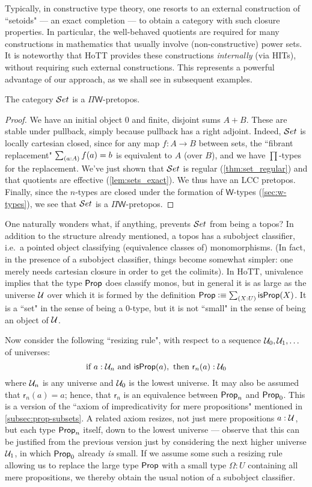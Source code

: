 Typically, in constructive type theory, one resorts to an external construction of ``setoids" --- an exact completion --- to obtain a category with such closure properties.  In particular, the well-behaved quotients are required for many constructions in mathematics that usually involve (non-constructive) power sets.  It is noteworthy that HoTT  provides these constructions \emph{internally} (via HITs), without requiring such external constructions.  This represents a powerful advantage of our approach, as we shall see in subsequent examples.

\begin{thm} The category $\mathcal{S}et$ is a $\Pi\mathsf{W}$-pretopos.
\end{thm}
\begin{proof}
We have an initial object $0$ and finite, disjoint sums $A+B$.  These are stable under pullback, simply because pullback has a right adjoint.  Indeed, $\mathcal{S}et$ is locally cartesian closed, since for any map $f:A\to B$ between sets, the ``fibrant replacement" $\sm{a:A}f(a)=b$ is equivalent to $A$ (over $B$), and we have $\prod$-types for the replacement.
We've just shown that $\mathcal{S}et$ is regular (\autoref{thm:set_regular}) and that quotients are effective (\autoref{lem:sets_exact}). We thus have an LCC pretopos. Finally, since the $n$-types are closed under the formation of $\mathsf{W}$-types
(\autoref{sec:w-types}), we see that $\mathcal{S}et$ is a $\Pi\mathsf{W}$-pretopos. 
\end{proof}

One naturally wonders what, if anything, prevents $\mathcal{S}et$ from being a topos? In addition to the structure already mentioned, a topos has a subobject classifier, i.e.\ a pointed object classifying (equivalence classes of) monomorphisms.  (In fact, in the presence of a subobject classifier, things become somewhat simpler: one merely needs cartesian closure in order to get the colimits).  In HoTT,  univalence implies that the type $\mathsf{Prop}$ does classify monos, but in general it is as large as the universe $\mathcal{U}$ over which it is formed by the definition $\prop \defeq \sm{X:U}\isprop(X)$. It is a ``set" in the sense of being a $0$-type, but it is not ``small" in the sense of being an object of $\mathcal{U}$.

Now consider the following ``resizing rule", with respect to a sequence $\mathcal{U}_0, \mathcal{U}_1, \ldots$ of universes:
\[\text{if } a:\mathcal{U}_n \text{ and\ } \mathsf{isProp}(a), \text{ then } \mathsf{r}_{n}(a): \mathcal{U}_0\]
where $\mathcal{U}_n$ is any universe and $\mathcal{U}_0$ is the lowest universe.
It may also be assumed that $\mathsf{r}_{n}(a) = a$; hence, that $\mathsf{r}_n$ is an equivalence between $\mathsf{Prop}_n$ and $\mathsf{Prop}_0$. 
This is a version of the ``axiom of impredicativity for mere propositions" mentioned in \autoref{subsec:prop-subsets}.  A related axiom resizes, not just mere propositions $a:\mathcal{U}$, but each type $\mathsf{Prop}_n$ itself, down to the lowest universe --- observe that this can be justified from the previous version just by considering the next higher universe $\mathcal{U}_1$, in which $\mathsf{Prop}_0$ already \emph{is} small.
If we assume some such a resizing rule allowing us to replace the large type $\mathsf{Prop}$ with a small type $\Omega:U$ containing all mere propositions, we thereby obtain the usual notion of a subobject classifier.
 
